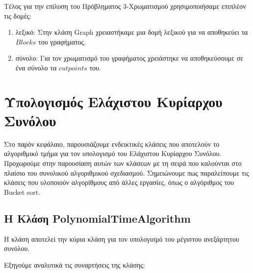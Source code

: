 Τέλος για την επίλυση του Πρόβληματος 3-Χρωματισμού χρησιμοποιήσαμε επιπλέον τις δομές:
 
\begin{enumerate}
	\item λεξικό: Στην κλάση Graph χρειαστήκαμε μια δομή λεξικού για να αποθηκεύει τα $Blocks$ του γραφήματος.
	
	\item σύνολο: Για τον χρωματισμό του γραφήματος χρειάστηκε να αποθηκεύσουμε σε ένα σύνολο τα $cutpoints$ του.
\end{enumerate}

\section{Υπολογισμός Ελάχιστου Κυρίαρχου Συνόλου}
\label{sec:Impl-Domination-set}

Στο παρόν κεφάλαιο, παρουσιάζουμε ενδεικτικές κλάσεις που αποτελούν το αλγοριθμικό τμήμα για τον υπολογισμό του Ελάχιστου Κυρίαρχου Συνόλου. Προχωρούμε στην παρουσίαση αυτών των κλάσεων με τη σειρά που καλούνται στο πλαίσιο του συνολικού αλγοριθμικού σχεδιασμού. Σημειώνουμε πως παραλείπουμε τις κλάσεις που υλοποιούν αλγορίθμους από άλλες εργασίες, όπως ο αλγόριθμος του Bucket sort.



\subsection{H Kλάση PolynomialTimeAlgorithm}
Η κλάση  αποτελεί την κύρια κλάση για τον υπολογισμό του μέγιστου ανεξάρτητου συνόλου.





Εξηγούμε αναλυτικά τις συναρτήσεις της κλάσης:

